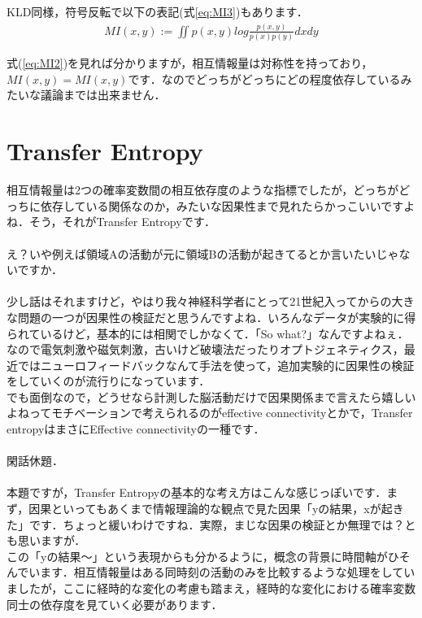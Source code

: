 \documentclass[11pt,a4paper,uplatex]{ujreport}
\begin{document}
KLD同様，符号反転で以下の表記(式\ref{eq:MI3})もあります．
\begin{eqnarray}
\label{eq:MI3}
  MI(x,y) := \iint p(x,y) log \frac{p(x,y)}{p(x)p(y)} dxdy
\end{eqnarray}

式(\ref{eq:MI2})を見れば分かりますが，相互情報量は対称性を持っており，$MI(x,y) = MI(x,y)$です．なのでどっちがどっちにどの程度依存しているみたいな議論までは出来ません．
\section{Transfer Entropy}
相互情報量は2つの確率変数間の相互依存度のような指標でしたが，どっちがどっちに依存している関係なのか，みたいな因果性まで見れたらかっこいいですよね．そう，それがTransfer Entropyです．\\
\\

え？いや例えば領域Aの活動が元に領域Bの活動が起きてるとか言いたいじゃないですか．\\
\\

少し話はそれますけど，やはり我々神経科学者にとって21世紀入ってからの大きな問題の一つが因果性の検証だと思うんですよね．いろんなデータが実験的に得られているけど，基本的には相関でしかなくて．「So what?」なんですよねぇ．なので電気刺激や磁気刺激，古いけど破壊法だったりオプトジェネティクス，最近ではニューロフィードバックなんて手法を使って，追加実験的に因果性の検証をしていくのが流行りになっています．\\

でも面倒なので，どうせなら計測した脳活動だけで因果関係まで言えたら嬉しいよねってモチベーションで考えられるのがeffective connectivityとかで，Transfer entropyはまさにEffective connectivityの一種です．\\
\\

閑話休題．\\
\\

本題ですが，Transfer Entropyの基本的な考え方はこんな感じっぽいです．まず，因果といってもあくまで情報理論的な観点で見た因果「yの結果，xが起きた」です．ちょっと緩いわけですね．実際，まじな因果の検証とか無理では？とも思いますが．\\

この「yの結果～」という表現からも分かるように，概念の背景に時間軸がひそんでいます．相互情報量はある同時刻の活動のみを比較するような処理をしていましたが，ここに経時的な変化の考慮も踏まえ，経時的な変化における確率変数同士の依存度を見ていく必要があります．\\
\\
\end{document}
